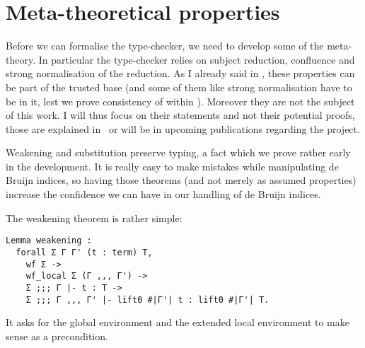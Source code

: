 \chapter{Meta-theoretical properties}

Before we can formalise the type-checker, we need to develop some of the
meta-theory. In particular the type-checker relies on subject reduction,
confluence and strong normalisation of the reduction.
As I already said in , these properties can be part of
the trusted base (and some of them like strong normalisation have to be in it,
lest we prove consistency of \Coq within \Coq). Moreover they are not the
subject of this work. I will thus focus on their statements and not their
potential proofs, those are explained in~ or will be
in upcoming publications regarding the \MetaCoq project.


Weakening and substitution preserve typing, a fact which we prove rather early
in the development. It is really easy to make mistakes while manipulating de
Bruijn indices, so having those theorems (and not merely as assumed properties)
increase the confidence we can have in our handling of de Bruijn indices.

The weakening theorem is rather simple:
\begin{verbatim}
Lemma weakening :
  forall Σ Γ Γ' (t : term) T,
    wf Σ ->
    wf_local Σ (Γ ,,, Γ') ->
    Σ ;;; Γ |- t : T ->
    Σ ;;; Γ ,,, Γ' |- lift0 #|Γ'| t : lift0 #|Γ'| T.
\end{verbatim}
It asks for the global environment and the extended local environment to make
sense as a precondition.

